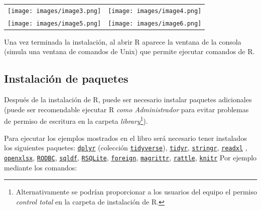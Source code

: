 \documentclass[
]{book}
\begin{document}
\begin{longtable}[]{@{}cc@{}}
\toprule\noalign{}
\endhead
\bottomrule\noalign{}
\endlastfoot
\texttt{[image: images/image3.png]} & \texttt{[image: images/image4.png]} \\
\texttt{[image: images/image5.png]} & \texttt{[image: images/image6.png]} \\
\end{longtable}

Una vez terminada la instalación, al abrir R aparece la ventana de la consola (simula una ventana de comandos de Unix) que permite ejecutar comandos de R.

\subsection{Instalación de paquetes}\label{instalaciuxf3n-de-paquetes}

Después de la instalación de R, puede ser necesario instalar paquetes adicionales (puede ser recomendable ejecutar R \emph{como Administrador} para evitar problemas de permiso de escritura en la carpeta \emph{library}\footnote{Alternativamente se podrían proporcionar a los usuarios del equipo el permiso \emph{control total} en la carpeta de instalación de R.}).

Para ejecutar los ejemplos mostrados en el libro será necesario tener instalados los siguientes paquetes:
\href{https://dplyr.tidyverse.org}{\texttt{dplyr}} (colección \href{https://www.tidyverse.org/}{\texttt{tidyverse}}),
\href{https://tidyr.tidyverse.org}{\texttt{tidyr}},
\href{https://stringr.tidyverse.org}{\texttt{stringr}},
\href{https://readxl.tidyverse.org}{\texttt{readxl}} ,
\href{https://cran.r-project.org/web/packages/openxlsx/index.html}{\texttt{openxlsx}}, \href{https://cran.r-project.org/web/packages/RODBC/index.html}{\texttt{RODBC}},
\href{https://cran.r-project.org/web/packages/sqldf/index.html}{\texttt{sqldf}},
\href{https://r-dbi.github.io/RSQLite}{\texttt{RSQLite}},
\href{https://cran.r-project.org/web/packages/foreign/index.html}{\texttt{foreign}},
\href{https://cran.r-project.org/web/packages/magrittr/index.html}{\texttt{magrittr}},
\href{https://rattle.togaware.com}{\texttt{rattle}},
\href{https://yihui.name/knitr}{\texttt{knitr}}
Por ejemplo mediante los comandos:
\end{document}
